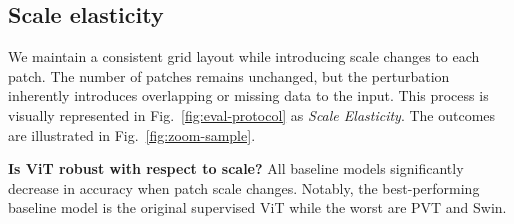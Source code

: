 \documentclass[10pt,twocolumn,letterpaper]{article}
\begin{document}
\subsection{Scale elasticity} \label{sec:scale-elasticity}


We maintain a consistent grid layout while introducing scale changes to each patch. The number of patches remains unchanged, but the perturbation inherently introduces overlapping or missing data to the input. This process is visually represented in Fig.~\ref{fig:eval-protocol} as \textit{Scale Elasticity}. The outcomes are illustrated in Fig.~\ref{fig:zoom-sample}.




\textbf{Is ViT robust with respect to scale?} \label{par:how-scale-elastic-stadard-vit}
All baseline models significantly decrease in accuracy when patch scale changes. Notably, the best-performing baseline model is the original supervised ViT while the worst are PVT and Swin. 

\end{document}
